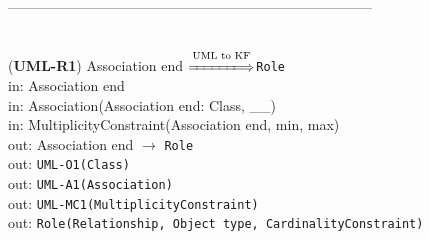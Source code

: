 \documentclass[sn-mathphys]{sn-jnl}
\begin{document}
------------------------------------------------------------------------------
\\ \

({\bf UML-R1}) Association end $\overset{\text{UML to KF}}{\xLongrightarrow{\hspace*{1.4cm}}}${\tt Role}\\
\hspace*{0.3cm}in: Association end\\
\hspace*{0.3cm}in: Association(Association end: Class, \_\_)\\
\hspace*{0.3cm}in: MultiplicityConstraint(Association end, min, max)\\
\hspace*{0.5cm}out: Association end $\rightarrow$ {\tt Role}\\
\hspace*{0.5cm}out: {\tt UML-O1(Class)}\\
\hspace*{0.5cm}out: {\tt UML-A1(Association)}\\
\hspace*{0.5cm}out: {\tt  UML-MC1(MultiplicityConstraint)}\\
\hspace*{0.5cm}out: {\tt Role(Relationship, Object type, CardinalityConstraint)}\\
\end{document}
